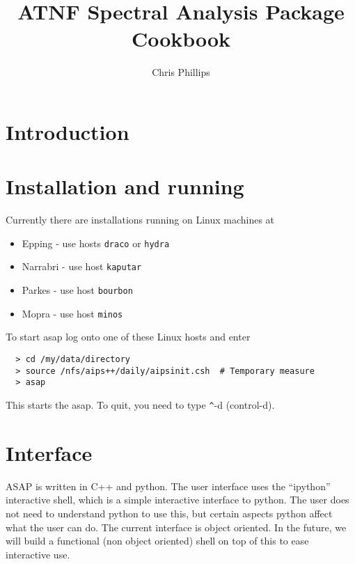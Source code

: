 \documentclass[11pt]{article}
\title{ATNF Spectral Analysis Package\\Cookbook }
\author{Chris Phillips}
\begin{document}
\maketitle

\section{Introduction}



\section{Installation and running}

Currently there are installations running on Linux machines at 

\begin{itemize}
\item Epping - use hosts {\tt draco} or {\tt hydra}
\item Narrabri - use host {\tt kaputar}
\item Parkes - use host {\tt bourbon}
\item Mopra - use host {\tt minos}
\end{itemize}

To start asap log onto one of these Linux hosts and  enter

\begin{verbatim}
  > cd /my/data/directory
  > source /nfs/aips++/daily/aipsinit.csh  # Temporary measure
  > asap
\end{verbatim}

This starts the asap. To quit, you need to type \verb+^+-d (control-d).

\section{Interface}

ASAP is written in C++ and python. The user interface uses the
``ipython'' interactive shell, which is a simple interactive interface
to python. The user does not need to understand python to use this,
but certain aspects python affect what the user can do.  The current
interface is object oriented.  In the future, we will build a
functional (non object oriented) shell on top of this to ease
interactive use.
\end{document}
